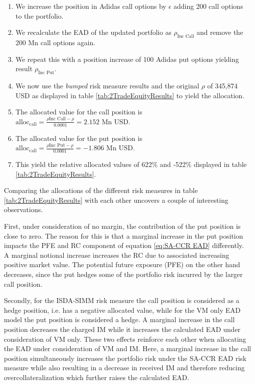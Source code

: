 \documentclass[../Thesis_AHoecherl.tex]{subfiles}
\begin{document}
    \begin{enumerate}
        \item We increase the position in Adidas call options by $\epsilon$ adding 200 call options to the portfolio.
        \item We recalculate the EAD of the updated portfolio as $\rho_{\text{Inc Call}}$ and remove the 200 Mn call options again.
        \item We repeat this with a position increase of 100 Adidas put options yielding result $\rho_{\text{Inc Put}}$.
        \item We now use the \emph{bumped} risk measure results and the original $\rho$ of 345,874 USD as displayed in table \ref{tab:2TradeEquityResults} to yield the allocation.
        \item The allocated value for the call position is $\text{alloc}_\text{call}=\frac{\rho{\text{Inc Call}-\rho}}{0.0001} = 2.152 \text{ Mn USD}$.
        \item The allocated value for the put position is $\text{alloc}_\text{call}=\frac{\rho{\text{Inc Put}-\rho}}{0.0001} = -1.806 \text{ Mn USD}$.
        \item This yield the relative allocated values of 622\% and -522\% displayed in table \ref{tab:2TradeEquityResults}.
    \end{enumerate}

    Comparing the allocations of the different risk measures in table \ref{tab:2TradeEquityResults} with each other uncovers a couple of interesting observations. 
    
    First, under consideration of no margin, the contribution of the put position is close to zero. 
    The reason for this is that a marginal increase in the put position impacts the PFE and RC component of equation \ref{eq:SA-CCR EAD} differently. A marginal notional increase increases the RC due to associated increasing positive market value.
    The potential future exposure (PFE) on the other hand decreases, since the put hedges some of the portfolio risk incurred by the larger call position.

    Secondly, for the ISDA-SIMM risk measure the call position is considered as a hedge position, i.e. has a negative allocated value, while for the VM only EAD model the put position is considered a hedge. 
    A marginal increase in the call position decreases the charged IM while it increases the calculated EAD under consideration of VM only. 
    These two effects reinforce each other when allocating the EAD under consideration of VM and IM. Here, a marginal increase in the call position simultaneously increases the portfolio risk under the SA-CCR EAD risk measure while also resulting in a decrease in received IM and therefore reducing overcollateralization which further raises the calculated EAD. 
    
\end{document}
